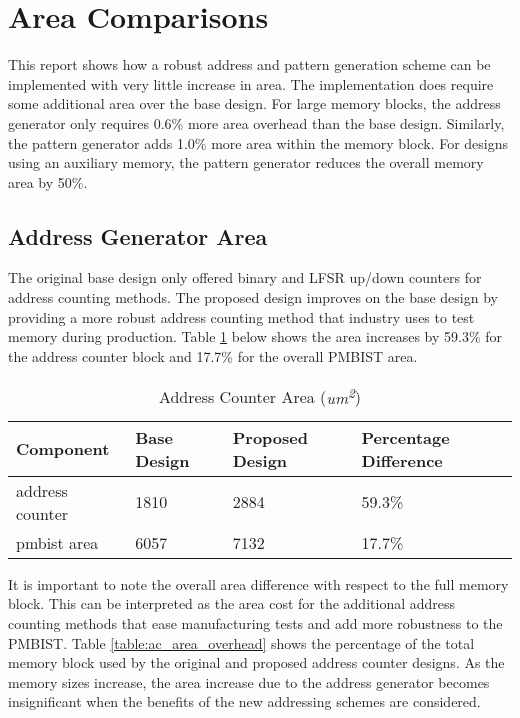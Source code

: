 \section{Area Comparisons}
This report shows how a robust address and pattern generation scheme can be implemented with very little increase in area.  The implementation does require some additional area over the base design.  For large memory blocks, the address generator only requires 0.6\% more area overhead than the base design.  Similarly, the pattern generator adds 1.0\% more area within the memory block.  For designs using an auxiliary memory, the pattern generator reduces the overall memory area by 50\%.  

\label{sect:cln-area}
\subsection{Address Generator Area}
The original base design only offered binary and LFSR up/down counters for address counting methods.  The proposed design improves on the base design by providing a more robust address counting method that industry uses to test memory during production.  Table \ref{table:ac_area_compare} below shows the area increases by  59.3\% for the address counter block and 17.7\% for the overall PMBIST area.  

\begin{table}[ht]
\caption{Address Counter Area (\textit{um\textsuperscript{2}})}
\centering
\begin{tabular}{| l | l | l | l |}
\hline
Component & Base Design & Proposed Design & Percentage Difference \\ [0.5ex]
\hline\hline
address counter & 1810   & 2884   & 59.3\% \\
pmbist area     & 6057   & 7132   & 17.7\% \\ 
\hline
\end{tabular}
\label{table:ac_area_compare}
\end{table}

It is important to note the overall area difference with respect to the full memory block.  This can be interpreted as the area cost for the additional address counting methods that ease manufacturing tests and add more robustness to the PMBIST.  Table \ref{table:ac_area_overhead} shows the percentage of the total memory block used by the original and proposed address counter designs.  As the memory sizes increase, the area increase due to the address generator becomes insignificant when the benefits of the new addressing schemes are considered.   

